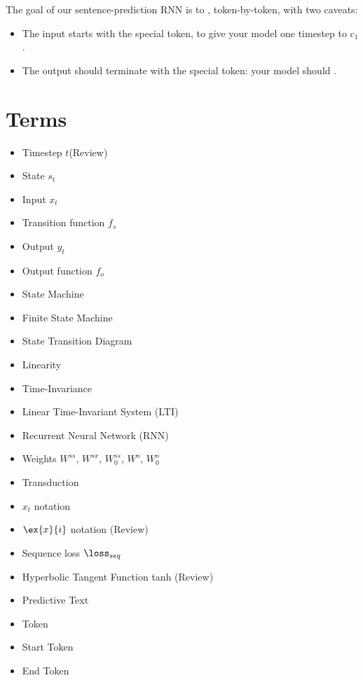         \begin{concept}
            The goal of our sentence-prediction RNN is to , token-by-token, with two caveats:

            \begin{itemize}
                \item The input starts with the special  token, to give your model one timestep to  $c_1$.
                \item The output should terminate with the special  token: your model should .
            \end{itemize}
        \end{concept}


\pagebreak

\section{Terms}

    \begin{itemize}
        \item Timestep $t$(Review)
        \item State $s_t$
        \item Input $x_t$
        \item Transition function $f_s$
        \item Output $y_t$
        \item Output function $f_o$
        \item State Machine
        \item Finite State Machine
        \item State Transition Diagram
        \item Linearity 
        \item Time-Invariance
        \item Linear Time-Invariant System (LTI)
        \item Recurrent Neural Network (RNN)
        \item Weights $W^{ss}$, $W^{sx}$, $W^{ss}_0$, $W^o$, $W^o_0$
        \item Transduction
        \item $x_t$ notation
        \item $\ex{x}{i}$ notation (Review)
        \item Sequence loss $\loss_{seq}$
        \item Hyperbolic Tangent Function tanh (Review)
        \item Predictive Text
        \item Token
        \item Start Token 
        \item End Token
    \end{itemize}
        

